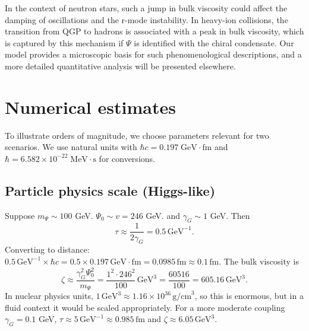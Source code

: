 \documentclass[aps,prd,reprint,superscriptaddress,floatfix]{revtex4-2}
\begin{document}
In the context of neutron stars, such a jump in bulk viscosity could affect the damping of oscillations and the r-mode instability. In heavy-ion collisions, the transition from QGP to hadrons is associated with a peak in bulk viscosity, which is captured by this mechanism if $\Psi$ is identified with the chiral condensate. Our model provides a microscopic basis for such phenomenological descriptions, and a more detailed quantitative analysis will be presented elsewhere.

\section{Numerical estimates}
\label{sec:estimates}

To illustrate orders of magnitude, we choose parameters relevant for two scenarios. We use natural units with $\hbar c = 0.197\;\mathrm{GeV\!\cdot\!fm}$ and $\hbar = 6.582\times10^{-22}\;\mathrm{MeV\!\cdot\!s}$ for conversions.

\subsection{Particle physics scale (Higgs-like)}
Suppose $m_\Psi \sim 100$ GeV. $\Psi_0 \sim v = 246$ GeV. and $\gamma_G \sim 1$ GeV. Then
\begin{equation}
\tau \approx \frac{1}{2\gamma_G} = 0.5\,\mathrm{GeV}^{-1}.
\end{equation}
Converting to distance: $0.5\,\mathrm{GeV}^{-1} \times \hbar c = 0.5 \times 0.197\,\mathrm{GeV\!\cdot\!fm} = 0.0985\,\mathrm{fm} \approx 0.1\,\mathrm{fm}$.
The bulk viscosity is
\begin{equation}
\zeta \approx \frac{\gamma_G^2 \Psi_0^2}{m_\Psi} = \frac{1^2 \cdot 246^2}{100}\,\mathrm{GeV}^3 = \frac{60516}{100} = 605.16\,\mathrm{GeV}^3.
\end{equation}
In nuclear physics units, $1\,\mathrm{GeV}^3 \approx 1.16\times 10^{36}\,\mathrm{g/cm}^3$, so this is enormous, but in a fluid context it would be scaled appropriately. For a more moderate coupling $\gamma_G = 0.1$ GeV, $\tau \approx 5\,\mathrm{GeV}^{-1} \approx 0.985\,\mathrm{fm}$ and $\zeta \approx 6.05\,\mathrm{GeV}^3$.
\end{document}
